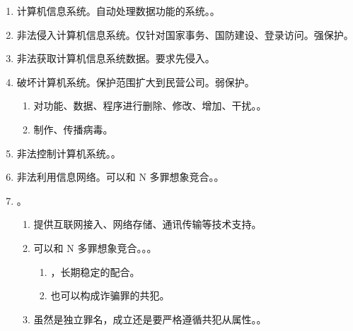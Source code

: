 \begin{enumerate}
\begin{enumerate}
          \item 计算机信息系统。自动处理数据功能的系统。。
          \item 非法侵入计算机信息系统。仅针对国家事务、国防建设、登录访问。强保护。
          \item 非法获取计算机信息系统数据。要求先侵入。
          \item 破坏计算机系统。保护范围扩大到民营公司。弱保护。
                \begin{enumerate}
                  \item 对功能、数据、程序进行删除、修改、增加、干扰。。
                  \item 制作、传播病毒。
                \end{enumerate}
          \item 非法控制计算机系统。。
          \item 非法利用信息网络。可以和 N 多罪想象竞合。。
          \item {}。
                \begin{enumerate}
                  \item 提供互联网接入、网络存储、通讯传输等技术支持。
                  \item 可以和 N 多罪想象竞合。。。
                        \begin{enumerate}
                          \item {}，长期稳定的配合。
                          \item {}也可以构成诈骗罪的共犯。
                        \end{enumerate}
                  \item 虽然是独立罪名，成立还是要严格遵循共犯从属性。。
                \end{enumerate}
        \end{enumerate}
\end{enumerate}
